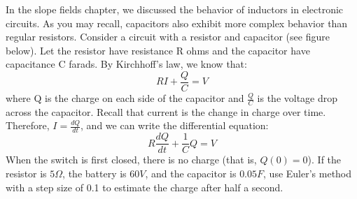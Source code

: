 \begin{Exercise}[label = eulercircuit]

In the slope fields chapter, we discussed the behavior of inductors in electronic circuits. As you may recall, capacitors also exhibit more complex behavior than regular resistors. Consider a circuit with a resistor and capacitor (see figure below). Let the resistor have resistance R ohms and the capacitor have capacitance C farads. By Kirchhoff's law, we know that:
$$RI + \frac{Q}{C} = V$$
where Q is the charge on each side of the capacitor and $\frac{Q}{C}$ is the voltage drop across the capacitor. Recall that current is the change in charge over time. Therefore, $I = \frac{dQ}{dt}$, and we can write the differential equation:
$$R \frac{dQ}{dt} + \frac{1}{C}Q = V$$
When the switch is first closed, there is no charge (that is, $Q(0) = 0$). If the resistor is $5 \Omega$, the battery is $60 V$, and the capacitor is $0.05 F$, use Euler's method with a step size of 0.1 to estimate the charge after half a second. 

\end{Exercise}

